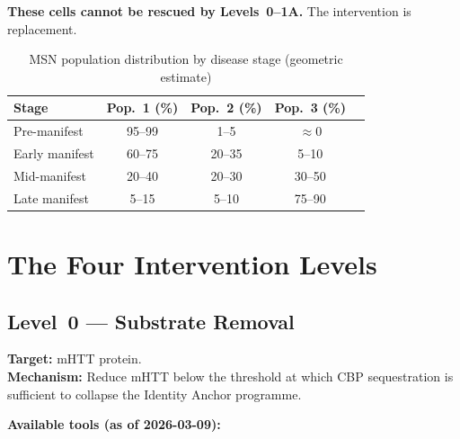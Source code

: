 \documentclass[12pt,a4paper]{article}
\begin{document}
\textbf{These cells cannot be rescued by Levels~0--1A.}
The intervention is replacement.

\begin{table}[ht!]
\centering
\caption{MSN population distribution by disease stage
  (geometric estimate)}
\label{tab:populations}
\begin{tabular}{lcccc}
\toprule
\textbf{Stage} &
\textbf{Pop.~1 (\%)} &
\textbf{Pop.~2 (\%)} &
\textbf{Pop.~3 (\%)} \\
\midrule
Pre-manifest   & 95--99 & 1--5  & $\approx$0  \\
Early manifest & 60--75 & 20--35 & 5--10 \\
Mid-manifest   & 20--40 & 20--30 & 30--50 \\
Late manifest  & 5--15  & 5--10  & 75--90 \\
\bottomrule
\end{tabular}
\end{table}

\section{The Four Intervention Levels}

\subsection{Level~0 --- Substrate Removal}

\textbf{Target:} mHTT protein.\\
\textbf{Mechanism:} Reduce mHTT below the threshold at which
CBP sequestration is sufficient to collapse the Identity
Anchor programme.

\medskip\noindent\textbf{Available tools (as of 2026-03-09):}
\end{document}
